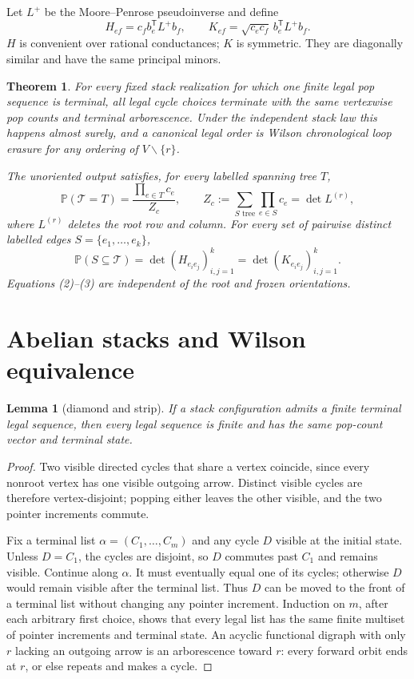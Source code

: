\documentclass[10pt]{article}
\newtheorem{theorem}{Theorem}
\newtheorem{lemma}{Lemma}
\newcommand{\Prb}{\mathbb P}
\newcommand{\T}{\mathcal T}
\begin{document}
Let $L^+$ be the Moore--Penrose pseudoinverse and define
\[
 H_{ef}=c_f b_e^{\mathsf T}L^+b_f,\qquad
 K_{ef}=\sqrt{c_ec_f}\,b_e^{\mathsf T}L^+b_f.                 \tag{1}
\]
$H$ is convenient over rational conductances; $K$ is symmetric.  They are
diagonally similar and have the same principal minors.

\begin{theorem}\label{thm:main}
For every fixed stack realization for which one finite legal pop sequence is
terminal, all legal cycle choices terminate with the same vertexwise pop
counts and terminal arborescence.  Under the independent stack law this
happens almost surely, and a canonical legal order is Wilson chronological
loop erasure for any ordering of $V\smallsetminus\{r\}$.

The unoriented output satisfies, for every labelled spanning tree $T$,
\[
 \Prb(\T=T)=\frac{\prod_{e\in T}c_e}{Z_c},\qquad
 Z_c:=\sum_{S\text{ tree}}\prod_{e\in S}c_e=\det L^{(r)},     \tag{2}
\]
where $L^{(r)}$ deletes the root row and column.  For every set of pairwise
distinct labelled edges $S=\{e_1,\ldots,e_k\}$,
\[
 \Prb(S\subseteq\T)=\det(H_{e_i e_j})_{i,j=1}^k
                    =\det(K_{e_i e_j})_{i,j=1}^k.            \tag{3}
\]
Equations (2)--(3) are independent of the root and frozen orientations.
\end{theorem}

\section{Abelian stacks and Wilson equivalence}
\begin{lemma}[diamond and strip]\label{lem:abelian}
If a stack configuration admits a finite terminal legal sequence, then every
legal sequence is finite and has the same pop-count vector and terminal state.
\end{lemma}
\begin{proof}
Two visible directed cycles that share a vertex coincide, since every nonroot
vertex has one visible outgoing arrow.  Distinct visible cycles are therefore
vertex-disjoint; popping either leaves the other visible, and the two pointer
increments commute.

Fix a terminal list $\alpha=(C_1,\ldots,C_m)$ and any cycle $D$ visible at the
initial state.  Unless $D=C_1$, the cycles are disjoint, so $D$ commutes past
$C_1$ and remains visible.  Continue along $\alpha$.  It must eventually equal
one of its cycles; otherwise $D$ would remain visible after the terminal list.
Thus $D$ can be moved to the front of a terminal list without changing any
pointer increment.  Induction on $m$, after each arbitrary first choice,
shows that every legal list has the same finite multiset of pointer increments
and terminal state.  An acyclic functional digraph with only $r$ lacking an
outgoing arrow is an arborescence toward $r$: every forward orbit ends at $r$,
or else repeats and makes a cycle.
\end{proof}
\end{document}
